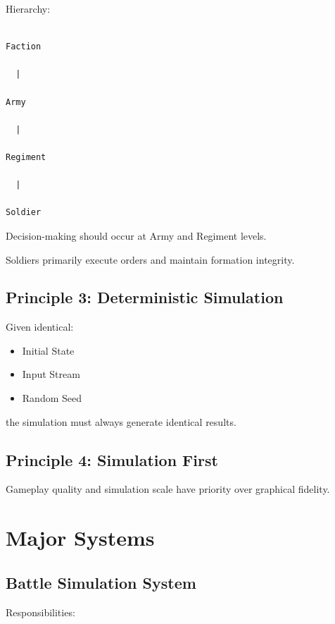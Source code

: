\documentclass[11pt,a4paper]{article}
\begin{document}
Hierarchy:

\begin{verbatim}

Faction

  |

Army

  |

Regiment

  |

Soldier

\end{verbatim}

Decision-making should occur at Army and Regiment levels.

Soldiers primarily execute orders and maintain formation integrity.

\subsection{Principle 3: Deterministic Simulation}

Given identical:

\begin{itemize}

    \item Initial State

    \item Input Stream

    \item Random Seed

\end{itemize}

the simulation must always generate identical results.

\subsection{Principle 4: Simulation First}

Gameplay quality and simulation scale have priority over graphical fidelity.

\section{Major Systems}

\subsection{Battle Simulation System}

Responsibilities:
\end{document}
